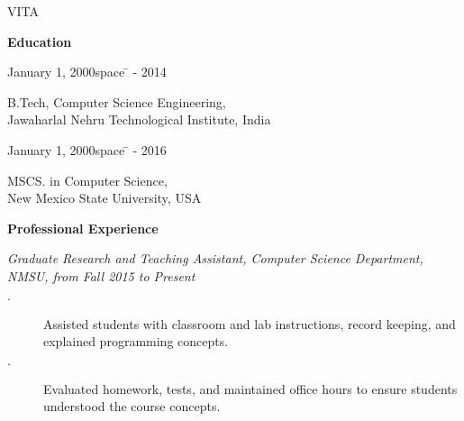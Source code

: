 \begin{center}
     VITA
\end{center}

\begin{center}
    \bf{Education}
\end{center}
\begin{tabbing}
     January 1, 2000space \=  - 2014 \> \parbox[t]{5.25in}{B.Tech, Computer Science Engineering,\\
     Jawaharlal Nehru Technological Institute, India}
\end{tabbing}
\begin{tabbing}
     January 1, 2000space \=  - 2016 \> \parbox[t]{5.25in}{MSCS. in Computer Science,\\
     New Mexico State University, USA}
\end{tabbing}

\begin{comment}
\begin{center}
    \bf{Presentations}
\end{center}
\noindent
{[1] \emph{Reliable Data Transport In High Bandwidth Networks Using Fountain Code}, Graduate Research and Art Symposium (GRAS), New Mexico State University, March, 2016.}\\ \\
\end{comment}

\begin{center}
    \bf{Professional Experience}
\end{center}
\noindent
{\emph{Graduate Research and Teaching Assistant, Computer Science Department, NMSU, from Fall 2015 to Present}\\}
\begin{description}
\item[$\cdot$] {Assisted students with classroom and lab instructions, record keeping, and explained programming concepts.}\
\item[$\cdot$] {Evaluated homework, tests, and maintained office hours to ensure students understood the course concepts. }\ 
\end{description}




